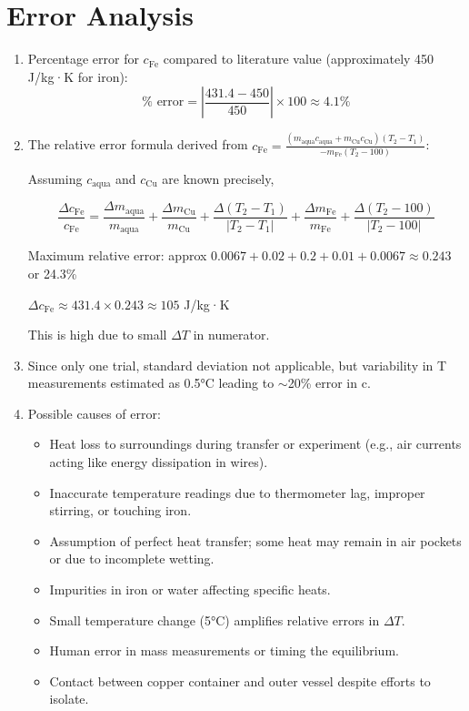 \documentclass[12pt, a4paper]{article}
\begin{document}
\section{Error Analysis}
\begin{enumerate}
\item Percentage error for $c_{\text{Fe}}$ compared to literature value (approximately 450 J/kg·K for iron):
\[ \% \text{ error} = \left| \frac{431.4 - 450}{450} \right| \times 100 \approx 4.1\% \]

\item The relative error formula derived from $c_{\text{Fe}} = \frac{(m_{\text{aqua}} c_{\text{aqua}} + m_{\text{Cu}} c_{\text{Cu}}) (T_2 - T_1)}{-m_{\text{Fe}} (T_2 - 100)}$:

Assuming $c_{\text{aqua}}$ and $c_{\text{Cu}}$ are known precisely, 

\[ \frac{\Delta c_{\text{Fe}}}{c_{\text{Fe}}} = \frac{\Delta m_{\text{aqua}}}{m_{\text{aqua}}} + \frac{\Delta m_{\text{Cu}}}{m_{\text{Cu}}} + \frac{\Delta (T_2 - T_1)}{|T_2 - T_1|} + \frac{\Delta m_{\text{Fe}}}{m_{\text{Fe}}} + \frac{\Delta (T_2 - 100)}{|T_2 - 100|} \]

Maximum relative error: approx $0.0067 + 0.02 + 0.2 + 0.01 + 0.0067 \approx 0.243$ or 24.3\%

$\Delta c_{\text{Fe}} \approx 431.4 \times 0.243 \approx 105$ J/kg·K

This is high due to small $\Delta T$ in numerator.

\item Since only one trial, standard deviation not applicable, but variability in T measurements estimated as 0.5°C leading to $\sim$20\% error in c.

\item Possible causes of error:
\begin{itemize}
\item Heat loss to surroundings during transfer or experiment (e.g., air currents acting like energy dissipation in wires).
\item Inaccurate temperature readings due to thermometer lag, improper stirring, or touching iron.
\item Assumption of perfect heat transfer; some heat may remain in air pockets or due to incomplete wetting.
\item Impurities in iron or water affecting specific heats.
\item Small temperature change (5°C) amplifies relative errors in $\Delta T$.
\item Human error in mass measurements or timing the equilibrium.
\item Contact between copper container and outer vessel despite efforts to isolate.
\end{itemize}
\end{enumerate}
\end{document}
